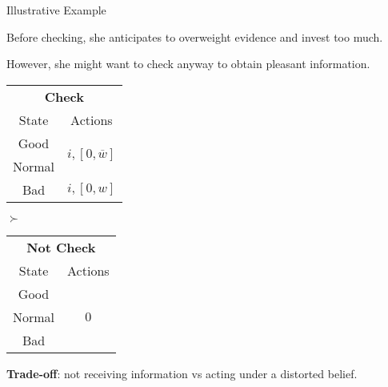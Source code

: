 \documentclass[usenames,dvipsnames,aspectratio=169,11pt, envcountsect, handout]{beamer}
\begin{document}
\begin{frame}[noframenumbering]{Illustrative Example}

	Before checking, she anticipates to overweight evidence and invest too much.

	\vfill

	However, she might want to check anyway to obtain pleasant information. \pause

	\vfill

	\begin{table}[H]
		\centering
		\begin{minipage}{0.29\textwidth}

		\end{minipage}\hspace{0.3cm} %
		\begin{minipage}{0.29\textwidth}
			\centering
			\begin{tabular}{c | c}
				\multicolumn{2}{c}{\textbf{Check}}                                                            \\
				State                & Actions                                                                \\
				\hline
				{\color{blue}Good}   & \multirow{2}{*}{{\color{blue}\( i, \left[ 0, \overline{w} \right] \)}} \\
				{\color{blue}Normal} &                                                                        \\
				Bad                  & \(  i, \left[0, w \right] \)                                           \\
			\end{tabular}
			\vspace{0.5cm} %
		\end{minipage}\hspace{0.7cm} %
		\( \succ \)
		\begin{minipage}{0.29\textwidth}
			\centering
			\begin{tabular}{c | c}
				\multicolumn{2}{c}{\textbf{Not Check}} \\
				State  & Actions                       \\
				\hline
				Good   & \multirow{3}{*}{ \( 0 \)}     \\
				Normal &                               \\
				Bad    &                               \\
			\end{tabular}
			\vspace{0.5cm} %
		\end{minipage}
	\end{table} \pause

	\vfill

	\textbf{Trade-off}: not receiving information vs acting under a distorted belief.

\end{frame}
\end{document}
